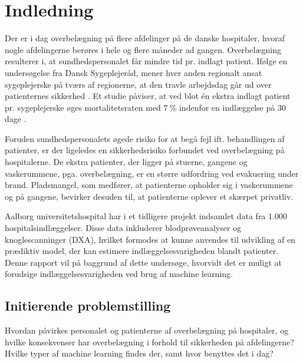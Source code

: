 \chapter{Indledning}
Der er i dag overbelægning på flere afdelinger på de danske hospitaler, hvoraf nogle afdelingerne berøres i hele og flere måneder ad gangen. \cite{2015} Overbelægning resulterer i, at sundhedspersonalet får mindre tid pr. indlagt patient. Ifølge en undersøgelse fra Dansk Sygeplejeråd, mener hver anden regionalt ansat sygeplejerske på tværs af regionerne, at den travle arbejdsdag går ud over patienternes sikkerhed \cite{Kjeldsen2015}. Et studie påviser, at ved blot én ekstra indlagt patient pr. sygeplejerske øges mortalitetsraten med $7~\%$ indenfor en indlæggelse på 30 dage  \cite{Aiken2014}. 

Foruden sundhedspersonalets øgede risiko for at begå fejl ift. behandlingen af patienter, er der ligeledes en sikkerhedsrisiko forbundet ved overbelægning på hospitalerne. De ekstra patienter, der ligger på stuerne, gangene og vaskerummene, pga. overbelægning, er en større udfordring ved evakuering under brand. Pladsmangel, som medfører, at patienterne opholder sig i vaskerummene og på gangene, bevirker desuden til, at patienterne oplever et skærpet privatliv. \cite{Madsen2014}

Aalborg universitetshospital har i et tidligere projekt indsamlet data fra $1.000$ hospitalsindlæggelser. Disse data inkluderer blodprøveanalyser og knoglescanninger (DXA), hvilket formodes at kunne anvendes til udvikling af en prædiktiv model, der kan estimere indlæggelsesvarigheden blandt patienter. Denne rapport vil på baggrund af dette undersøge, hvorvidt det er muligt at forudsige indlæggelsesvarigheden ved brug af machine learning. 



\section{Initierende problemstilling} 
Hvordan påvirkes personalet og patienterne af overbelægning på hospitaler, og hvilke konsekvenser har overbelægning i forhold til sikkerheden på afdelingerne?
Hvilke typer af machine learning findes der, samt hvor benyttes det i dag?

